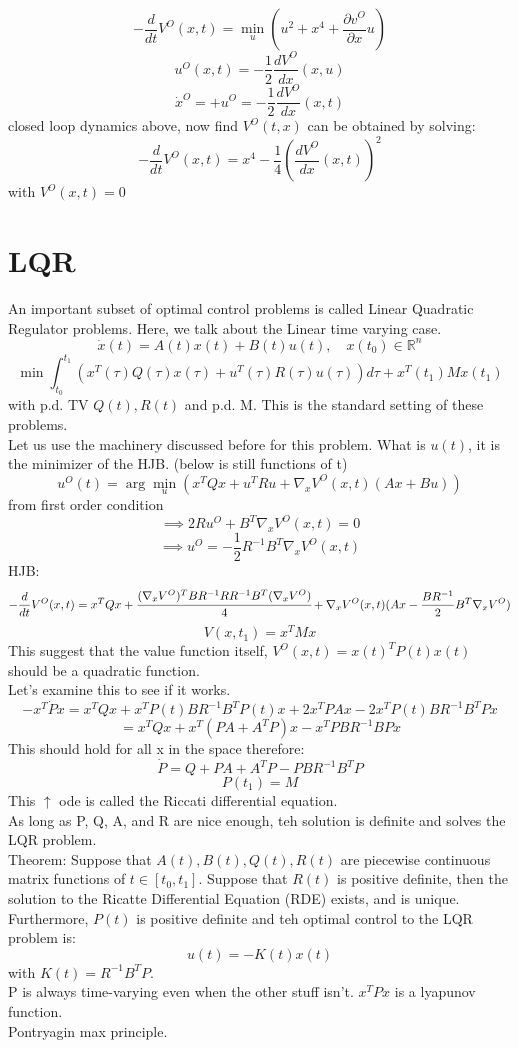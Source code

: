 \documentclass{article}
\begin{document}
\[-\frac{d}{dt}V^O(x,t)=\min_u(u^2+x^4+\frac{\partial v^O}{\partial x}u)\]
\[u^O(x,t)=-\frac{1}{2}\frac{dV^O}{dx}(x,u)\]
\[\dot{x}^O=+u^O=-\frac{1}{2}\frac{dV^O}{dx}(x,t)\]
closed loop dynamics above, now find $V^O(t,x)$ can be obtained by solving:
\[-\frac{d}{dt}V^O(x,t)=x^4-\frac{1}{4}(\frac{dV^O}{dx}(x,t))^2\]
with $V^O(x,t)=0$\\

\section{LQR}
An important subset of optimal control problems is called Linear Quadratic Regulator problems. Here, we talk about the Linear time varying case.\\
\[\dot{x}(t)=A(t)x(t)+B(t)u(t),\quad x(t_0)\in\mathbb{R}^n\]
\[\min \int_{t_0}^{t_1}(x^T(\tau)Q(\tau)x(\tau)+u^T(\tau)R(\tau)u(\tau))d\tau+x^T(t_1)Mx(t_1)\]
with p.d. TV $Q(t),R(t)$ and p.d. M. This is the standard setting of these problems.\\

Let us use the machinery discussed before for this problem. What is $u(t)$, it is the minimizer of the HJB. (below is still functions of t)
\[u^O(t)=\arg\min_u(x^TQx+u^TRu+\nabla_xV^O(x,t)(Ax+Bu))\]
from first order condition
\[\implies 2Ru^O+B^T\nabla_x V^O(x,t)=0\]
\[\implies u^O=-\frac{1}{2}R^{-1}B^T\nabla_xV^O(x,t)\]
HJB:
\[-\frac{d}{dt}V^O(x,t)=x^TQx+\cfrac{(\nabla_xV^O)^TBR^{-1}RR^{-1}B^T(\nabla_xV^O)}{4}+\nabla_xV^O(x,t)(Ax-\frac{BR^{-1}}{2}B^T\nabla_xV^O)\]
\[V(x,t_1)=x^TMx\]
This suggest that the value function itself, $V^O(x,t)=x(t)^TP(t)x(t)$ should be a quadratic function.\\
Let's examine this to see if it works.\\
\[-x^T\dot{P}x=x^TQx+x^TP(t)BR^{-1}B^TP(t)x+2x^TPAx-2x^TP(t)BR^{-1}B^TPx\]
\[=x^TQx+x^T(PA+A^TP)x-x^TPBR^{-1}BPx\]
This should hold for all x in the space therefore:
\[\dot{P}=Q+PA+A^TP-PBR^{-1}B^TP\]
\[P(t_1)=M\]
This $\uparrow$ ode is called the Riccati differential equation.\\
As long as P, Q, A, and R are nice enough, teh solution is definite and solves the LQR problem.\\
Theorem: Suppose that $A(t),B(t),Q(t),R(t)$ are piecewise continuous matrix functions of $t\in [t_0,t_1]$. Suppose that $R(t)$ is positive definite, then the solution to the Ricatte Differential Equation (RDE) exists, and is unique. Furthermore, $P(t)$ is positive definite and teh optimal control to the LQR problem is:
\[u(t)=-K(t)x(t)\]
with $K(t)=R^{-1}B^TP$.\\

P is always time-varying even when the other stuff isn't. $x^TPx$ is a lyapunov function.\\
Pontryagin max principle.\\
\end{document}
